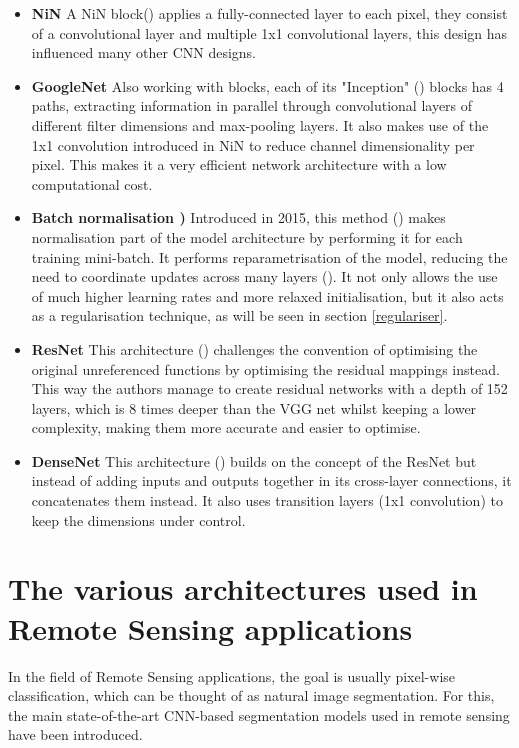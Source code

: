 \begin{itemize}

    \item \textbf{\gls{NiN}}  A \gls{NiN} block(\cite{lin2014network}) applies a fully-connected layer to each pixel, they consist of a convolutional layer and multiple 1x1 convolutional layers, this design has influenced many other \gls{CNN} designs.
 
    \item \textbf{GoogleNet } Also working with blocks, each of its "Inception" (\cite{7298594}) blocks has 4 paths, extracting information in parallel through convolutional layers of different filter dimensions and max-pooling layers. It also makes use of the 1x1 convolution introduced in \gls{NiN} to reduce channel dimensionality per pixel. This makes it a very efficient network architecture with a low computational cost.
    
    \item \textbf{Batch normalisation )} Introduced in 2015, this method (\cite{ioffe2015batch}) makes normalisation part of the model architecture by performing it for each training mini-batch. It performs reparametrisation of the model, reducing the need to coordinate updates across many layers (\cite{GoodBengCour16}). It not only allows the use of much higher learning rates and more relaxed initialisation, but it also acts as a regularisation technique, as will be seen in section \ref{regulariser}.
    
    \item \textbf{ResNet} This architecture (\cite{he2015deep}) challenges the convention of optimising the original unreferenced functions by optimising the residual mappings instead. This way the authors manage to create residual networks with a depth of 152 layers, which is 8 times deeper than the VGG net whilst keeping a lower complexity, making them more accurate and easier to optimise. 
    \item \textbf{DenseNet} This architecture (\cite{8099726}) builds on the concept of the ResNet but instead of adding inputs and outputs together in its cross-layer connections, it concatenates them instead. It also uses transition layers (1x1 convolution) to keep the dimensions under control.

\end{itemize}

\section{The various architectures used in Remote Sensing applications} \label{seg_nets}
In the field of Remote Sensing applications, the goal is usually pixel-wise classification, which can be thought of as natural image segmentation. For this, the main state-of-the-art \gls{CNN}-based segmentation models used in remote sensing have been introduced.

